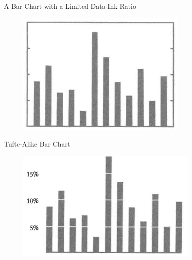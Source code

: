 \documentclass[aspectratio=1610]{beamer}
\begin{document}
\begin{frame}{A Bar Chart with a Limited Data-Ink Ratio}{}
	\begin{figure}
		\begin{center}
			\includegraphics[width=0.75\textwidth]{images/trad_barchart.png}
		\end{center}
	\end{figure}

\end{frame}

\begin{frame}{Tufte-Alike Bar Chart}{}
	\begin{figure}
		\begin{center}
			\includegraphics[width=0.8\textwidth]{images/tufte_barchart.png}
		\end{center}
	\end{figure}

\end{frame}
\end{document}
